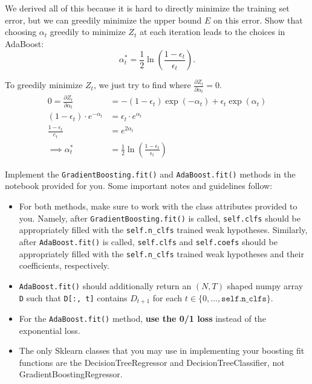 \problem[2]
We derived all of this because it is hard to directly minimize the training set error, but we can greedily minimize the upper bound $E$ on this error. Show that choosing $\alpha_t$
greedily to minimize $Z_t$ at each iteration leads to the choices in
AdaBoost:
$$\alpha_{t}^* = \frac{1}{2} \ln \left(\frac{1 - \epsilon_t}{\epsilon_t} \right).$$

\begin{solution}
    To greedily minimize $Z_t$, we just try to find where $\frac{\partial{Z_{t}}}{\partial{\alpha_{t}}} = 0$.
    \begin{align*}
        0 = \frac{\partial{Z_t}}{\partial{\alpha_t}} &= -(1 - \epsilon_{t})\exp(-\alpha_{t}) + \epsilon_{t}\exp(\alpha_{t}) \\
        (1 - \epsilon_{t})\cdot{e^{-\alpha_{t}}} &= \epsilon_{t}\cdot{e^{\alpha_{t}}} \\
        \frac{1-\epsilon_{t}}{e_{t}} &= e^{2\alpha_{t}} \\
        \implies \alpha_{t}^* &= \frac{1}{2}\ln(\frac{1 - \epsilon_t}{\epsilon_t})
    \end{align*}
\end{solution}

\begin{problem}[14]
    Implement the \texttt{GradientBoosting.fit()} and \texttt{AdaBoost.fit()} methods in the notebook provided for you. Some important notes and guidelines follow:
    \begin{itemize}
        \item For both methods, make sure to work with the class attributes provided to you. Namely, after \texttt{GradientBoosting.fit()} is called, \texttt{self.clfs} should be appropriately filled with the \texttt{self.n_clfs} trained weak hypotheses. Similarly, after \texttt{AdaBoost.fit()} is called, \texttt{self.clfs} and \texttt{self.coefs} should be appropriately filled with the \texttt{self.n_clfs} trained weak hypotheses and their coefficients, respectively.
        \item \texttt{AdaBoost.fit()} should additionally return an $(N, T)$ shaped numpy array \texttt{D} such that \texttt{D[:, t]} contains $D_{t+1}$ for each $t \in \{0, \ldots, \texttt{self.n_clfs}\}$.
        \item For the \texttt{AdaBoost.fit()} method, \textbf{use the 0/1 loss} instead of the exponential loss.
	\item The only Sklearn classes that you may use in implementing your boosting fit functions are the DecisionTreeRegressor and DecisionTreeClassifier, not GradientBoostingRegressor.
    \end{itemize}
\end{problem}

